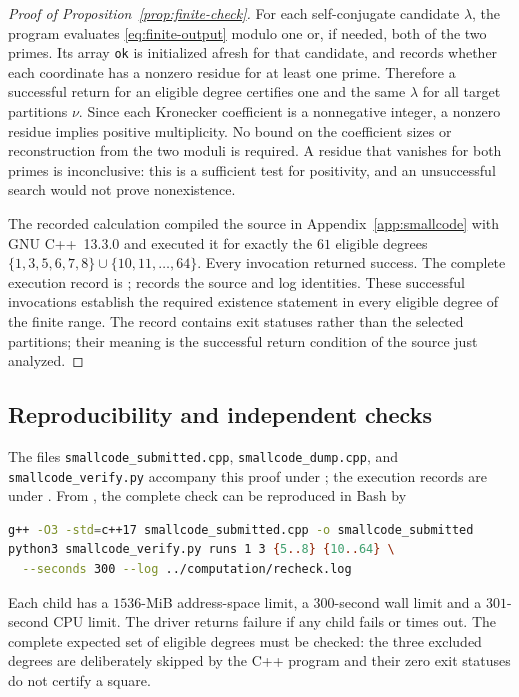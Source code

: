 \begin{proof}[Proof of Proposition~\ref{prop:finite-check}]
For each self-conjugate candidate $\lambda$, the program evaluates
\eqref{eq:finite-output} modulo one or, if needed, both of the two
primes. Its array
\texttt{ok} is initialized afresh for that candidate, and records whether
each coordinate has a nonzero residue for at least one prime.  Therefore
a successful return for an eligible degree certifies one and the same
$\lambda$ for all target partitions $\nu$.  Since each Kronecker
coefficient is a nonnegative integer, a nonzero residue implies positive
multiplicity.  No bound on the coefficient sizes or reconstruction from
the two moduli is required.
A residue that vanishes for both primes is inconclusive: this is a
sufficient test for positivity, and an unsuccessful search would not
prove nonexistence.

The recorded calculation compiled the source in
Appendix~\ref{app:smallcode} with GNU C++~13.3.0 and executed it
for exactly the $61$ eligible degrees
$\{1,3,5,6,7,8\}\cup\{10,11,\ldots,64\}$.
Every invocation returned success. The complete execution record is
;
 records the source and log identities.
These successful invocations
establish the required existence statement in every eligible degree of
the finite range. The record contains exit statuses rather than the
selected partitions; their meaning is the successful return condition
of the source just analyzed.
\end{proof}

\subsection{Reproducibility and independent checks}

The files \texttt{smallcode\_submitted.cpp},
\texttt{smallcode\_dump.cpp}, and \texttt{smallcode\_verify.py} accompany
this proof under ; the execution records are under
. From , the complete check can be
reproduced in Bash by
\begin{lstlisting}[language=bash,basicstyle=\ttfamily\footnotesize]
g++ -O3 -std=c++17 smallcode_submitted.cpp -o smallcode_submitted
python3 smallcode_verify.py runs 1 3 {5..8} {10..64} \
  --seconds 300 --log ../computation/recheck.log
\end{lstlisting}
Each child has a $1536$-MiB address-space limit, a $300$-second wall
limit and a $301$-second CPU limit. The driver returns failure if any
child fails or times out. The complete expected set of eligible degrees
must be checked: the three excluded degrees are deliberately skipped by
the C++ program and their zero exit statuses do not certify a square.

